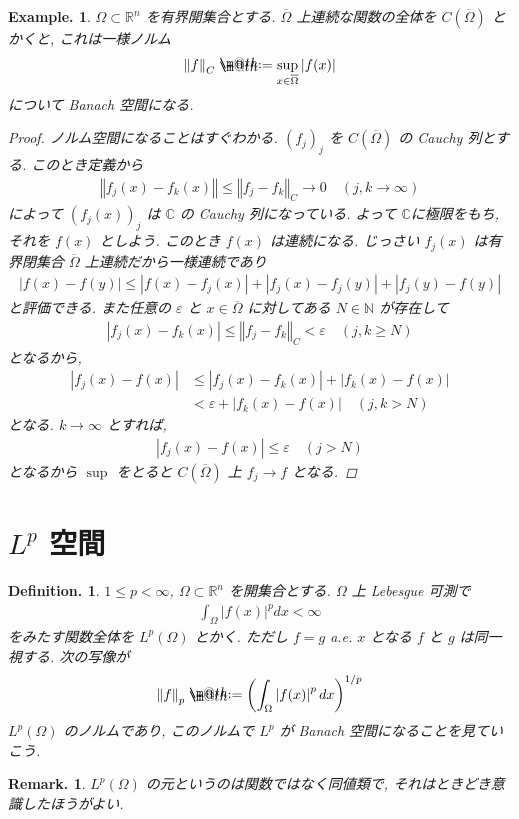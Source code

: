\documentclass[openany, a4paper, oneside]{jsbook}
\makeatletter
\newcommand*{\defeq}{\mathrel{\rlap{%
\raisebox{0.3ex}{$\m@th\cdot$}}%
\raisebox{-0.3ex}{$\m@th\cdot$}}%
=}
\theoremstyle{break}
\theoremstyle{breakdefn}
\newtheorem{defn}[thm]{Definition.}
\newtheorem{ex}[thm]{Example.}
\newtheorem{rem}[thm]{Remark.}
\newcommand{\abs}[1]{\left|#1\right|}
\newcommand{\norm}[1]{\left\Vert#1\right\Vert}
\newcommand{\rbk}[1]{\left (#1\right)}
\newcommand{\bbRn}{\mathbb{R}^n}
\makeatother
\begin{document}
\begin{ex}
$\Omega \subset \bbRn$ を有界開集合とする.
$\overline{\Omega}$ 上連続な関数の全体を $C(\overline{\Omega})$ とかくと,
これは一様ノルム
\begin{align}
 \norm{f}_C
 \defeq
 \sup_{x \in \overline{\Omega}} \abs{f(x)}
\end{align}
について Banach 空間になる.
\begin{proof}
ノルム空間になることはすぐわかる.
$(f_j)_j$ を $C(\overline{\Omega})$ の Cauchy 列とする.
このとき定義から
\begin{align}
 \norm{f_j(x) - f_k(x)}
 \leq
 \norm{f_j - f_k}_C \to 0 \quad (j, k \to \infty)
\end{align}
によって $(f_j(x))_j$ は $\mathbb{C}$ の Cauchy 列になっている.
よって $\mathbb{C}$に極限をもち, それを $f(x)$ としよう.
このとき $f(x)$ は連続になる.
じっさい $f_j(x)$ は有界閉集合 $\overline{\Omega}$ 上連続だから一様連続であり
\begin{align}
 \abs{f(x) - f(y)}
 \leq
 \abs{f(x) - f_j(x)} + \abs{f_j(x) - f_j(y)} + \abs{f_j(y) - f(y)}
\end{align}
と評価できる.
また任意の $\varepsilon$ と $x \in \overline{\Omega}$ に対してある $N\in \mathbb{N}$ が存在して
\begin{align}
 \abs{f_j (x) - f_k(x)}
 \leq
 \norm{f_j - f_k}_C
 <
 \varepsilon \quad (j, k \geq N)
\end{align}
となるから,
\begin{align}
 \abs{f_j(x) - f(x)}
 &\leq
 \abs{f_j(x) - f_k(x)} + \abs{f_k(x) - f(x)} \\
 &<
 \varepsilon + \abs{f_k(x) - f(x)} \quad (j, k > N)
\end{align}
となる.
$k \to \infty$ とすれば,
\begin{align}
 \abs{f_j(x) - f(x)}
 \leq
 \varepsilon \quad (j > N)
\end{align}
となるから $\sup$ をとると $C(\overline{\Omega})$ 上 $f_j \to f$ となる.
\end{proof}
\end{ex}
\section{$L^p$ 空間}


\begin{defn}
$1 \le p < \infty$, $\Omega \subset \bbRn$ を開集合とする.
$\Omega$ 上 Lebesgue 可測で
\begin{align}
 \int_{\Omega} \abs{f(x)}^p dx
 <
 \infty
\end{align}
をみたす関数全体を $L^p(\Omega)$ とかく.
ただし $f = g$ a.e. $x$ となる $f$ と $g$ は同一視する.
次の写像が
\begin{align}
 \norm{f}_p
 \defeq
 \rbk{\int_{\Omega} \abs{f(x)}^p dx}^{1/p}
\end{align}
$L^p (\Omega)$ のノルムであり, このノルムで $L^p$ が Banach 空間になることを見ていこう.
\end{defn}
\begin{rem}
$L^p(\Omega)$ の元というのは関数ではなく同値類で, それはときどき意識したほうがよい.
\end{rem}
\end{document}
